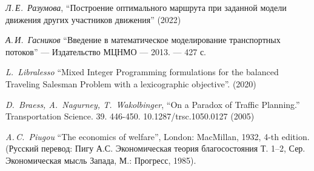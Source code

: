 \documentclass[12pt, a4paper]{article}
\begin{document}
    \newpage
\begin{thebibliography}{0}
	
	
	 \textit{Л.\,Е.~Разумова}, ``Построение оптимального маршрута при заданной модели движения других участников движения'' (2022)
	
	 \textit{А.\,И.~Гасников} ``Введение в математическое моделирование транспортных потоков'' --- Издательство МЦНМО --- 2013. --- 427 с.
	
	 \textit{L.~Libralesso} ``Mixed Integer Programming formulations for the balanced Traveling Salesman Problem with a lexicographic objective''. (2020)
	
	 \textit{D.~Braess, A.~Nagurney, T.~Wakolbinger}, ``On a Paradox of Traffic Planning.'' Transportation Science. 39. 446-450. 10.1287/trsc.1050.0127 (2005)
	
	 \textit{A.\,C.~Piugou} ``The economics of welfare'', London: MacMillan, 1932,
	4-th edition. (Русский перевод: Пигу А.С. Экономическая теория благосостояния Т. 1–2, Сер. Экономическая мысль Запада,
	М.: Прогресс, 1985).
	
\end{thebibliography} 
\end{document}
